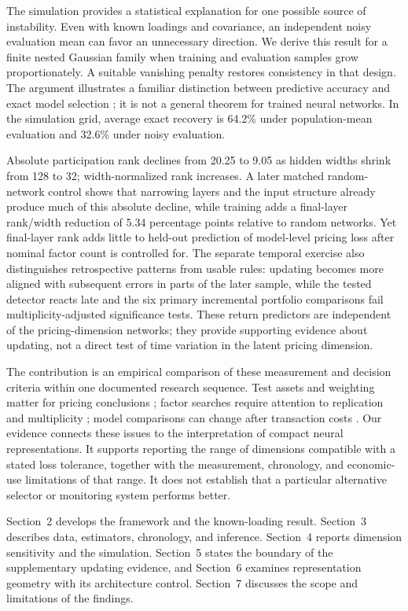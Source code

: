 The simulation provides a statistical explanation for one possible source of instability. Even with known loadings and covariance, an independent noisy evaluation mean can favor an unnecessary direction. We derive this result for a finite nested Gaussian family when training and evaluation samples grow proportionately. A suitable vanishing penalty restores consistency in that design. The argument illustrates a familiar distinction between predictive accuracy and exact model selection \citep{shao1993cv,yang2007cv}; it is not a general theorem for trained neural networks. In the simulation grid, average exact recovery is 64.2\% under population-mean evaluation and 32.6\% under noisy evaluation.

Absolute participation rank declines from 20.25 to 9.05 as hidden widths shrink from 128 to 32; width-normalized rank increases. A later matched random-network control shows that narrowing layers and the input structure already produce much of this absolute decline, while training adds a final-layer rank/width reduction of 5.34 percentage points relative to random networks. Yet final-layer rank adds little to held-out prediction of model-level pricing loss after nominal factor count is controlled for. The separate temporal exercise also distinguishes retrospective patterns from usable rules: updating becomes more aligned with subsequent errors in parts of the later sample, while the tested detector reacts late and the six primary incremental portfolio comparisons fail multiplicity-adjusted significance tests. These return predictors are independent of the pricing-dimension networks; they provide supporting evidence about updating, not a direct test of time variation in the latent pricing dimension.

The contribution is an empirical comparison of these measurement and decision criteria within one documented research sequence. Test assets and weighting matter for pricing conclusions \citep{hansen1997assessing,lewellen2010skeptical}; factor searches require attention to replication and multiplicity \citep{feng2020taming,hou2020replicating}; model comparisons can change after transaction costs \citep{detzel2023costs}. Our evidence connects these issues to the interpretation of compact neural representations. It supports reporting the range of dimensions compatible with a stated loss tolerance, together with the measurement, chronology, and economic-use limitations of that range. It does not establish that a particular alternative selector or monitoring system performs better.

Section~2 develops the framework and the known-loading result. Section~3 describes data, estimators, chronology, and inference. Section~4 reports dimension sensitivity and the simulation. Section~5 states the boundary of the supplementary updating evidence, and Section~6 examines representation geometry with its architecture control. Section~7 discusses the scope and limitations of the findings.
